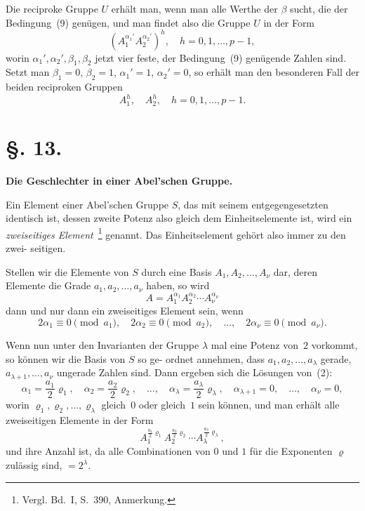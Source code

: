 \documentclass[12pt,a4paper]{article}
\theoremstyle{plain}
\theoremstyle{definition}
\theoremstyle{remark}
\begin{document}
Die reciproke Gruppe $U$ erhält man, wenn man alle Werthe
der $\beta$ sucht, die der Bedingung~(9) genügen, und man findet
also die Gruppe $U$ in der Form
\[
(A_1^{\alpha_1'} A_2^{\alpha_2'})^h, \quad h = 0, 1, \ldots, p-1,
\]
worin $\alpha_1', \alpha_2', \beta_1, \beta_2$ jetzt vier feste, der Bedingung~(9) genügende
Zahlen sind. Setzt man $\beta_1 = 0$, $\beta_2 = 1$, $\alpha_1' = 1$, $\alpha_2' = 0$, so
erhält man den besonderen Fall der beiden reciproken Gruppen
\[
A_1^h, \quad A_2^h, \quad h = 0, 1, \ldots, p-1.
\]


\section*{\S. 13.}
\begin{center}
\textbf{Die Geschlechter in einer Abel'schen Gruppe.}
\end{center}

Ein Element einer Abel'schen Gruppe $S$, das mit seinem
entgegengesetzten identisch ist, dessen zweite Potenz also gleich
dem Einheitselemente ist, wird ein \emph{zweiseitiges Element}~\footnote{%
Vergl. Bd.~I, S.~390, Anmerkung.}
genannt. Das Einheitselement gehört also immer zu den zwei-
seitigen.

Stellen wir die Elemente von $S$ durch eine Basis $A_1, A_2, \ldots, A_\nu$
dar, deren Elemente die Grade $a_1, a_2, \ldots, a_\nu$ haben, so wird
\begin{equation}\tag{1}
A = A_1^{\alpha_1} A_2^{\alpha_2} \cdots A_\nu^{\alpha_\nu}
\end{equation}
dann und nur dann ein zweiseitiges Element sein, wenn
\begin{equation}\tag{2}
2\alpha_1 \equiv 0 \pmod{a_1}, \quad 2\alpha_2 \equiv 0 \pmod{a_2}, \quad \ldots, \quad 2\alpha_\nu \equiv 0 \pmod{a_\nu}.
\end{equation}

Wenn nun unter den Invarianten der Gruppe $\lambda$ mal eine
Potenz von~$2$ vorkommt, so können wir die Basis von $S$ so ge-
ordnet annehmen, dass $a_1, a_2, \ldots, a_\lambda$ gerade, $a_{\lambda+1}, \ldots, a_\nu$ ungerade
Zahlen sind. Dann ergeben sich die Lösungen von~(2):
\[
\alpha_1 = \frac{a_1}{2} \varrho_1, \quad \alpha_2 = \frac{a_2}{2} \varrho_2, \quad \ldots, \quad \alpha_\lambda = \frac{a_\lambda}{2} \varrho_\lambda, \quad \alpha_{\lambda+1} = 0, \quad \ldots, \quad \alpha_\nu = 0,
\]
worin $\varrho_1, \varrho_2, \ldots, \varrho_\lambda$ gleich~$0$ oder gleich~$1$ sein können, und man
erhält alle zweiseitigen Elemente in der Form
\[
A_1^{\frac{a_1}{2} \varrho_1} A_2^{\frac{a_2}{2} \varrho_2} \cdots A_\lambda^{\frac{a_\lambda}{2} \varrho_\lambda},
\]
und ihre Anzahl ist, da alle Combinationen von $0$ und $1$ für die
Exponenten $\varrho$ zulässig sind, $= 2^\lambda$.
\end{document}
